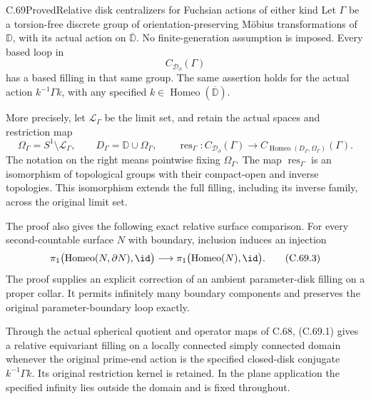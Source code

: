 \begin{claim}{C.69}{Proved}{Relative disk centralizers for Fuchsian actions of either kind}
Let $\Gamma$ be a torsion-free discrete group of
orientation-preserving M\"obius transformations of
$\mathbb D$, with its actual action on
$\overline{\mathbb D}$. No finite-generation
assumption is imposed. Every based loop in
\[
                 C_{\mathcal D_\partial}(\Gamma)
                                                               \tag{C.69.1}
\]
has a based filling in that same group.
The same assertion holds for the actual action
$k^{-1}\Gamma k$, with any specified
$k\in\operatorname{Homeo}(\overline{\mathbb D})$.

More precisely, let $\mathcal L_\Gamma$ be the
limit set, and retain the actual spaces and
restriction map
\[
 \Omega_\Gamma=S^1\setminus\mathcal L_\Gamma,\qquad
 D_\Gamma=\mathbb D\cup\Omega_\Gamma,\qquad
 \operatorname{res}_\Gamma:
 C_{\mathcal D_\partial}(\Gamma)\longrightarrow
 C_{\operatorname{Homeo}(D_\Gamma,\Omega_\Gamma)}(\Gamma).
                                                               \tag{C.69.2}
\]
The notation on the right means pointwise fixing
$\Omega_\Gamma$. The map
$\operatorname{res}_\Gamma$ is an isomorphism
of topological groups with their compact-open
and inverse topologies. This isomorphism
extends the full filling, including its inverse
family, across the original limit set.

The proof also gives the following exact relative
surface comparison. For every second-countable
surface $N$ with boundary, inclusion induces
an injection
\[
 \pi_1\bigl(\operatorname{Homeo}(N,\partial N),\id\bigr)
       \longrightarrow
 \pi_1\bigl(\operatorname{Homeo}(N),\id\bigr).
                                                               \tag{C.69.3}
\]
The proof supplies an explicit correction of an
ambient parameter-disk filling on a proper collar.
It permits infinitely many boundary components
and preserves the original parameter-boundary
loop exactly.

Through the actual spherical quotient and
operator maps of C.68, (C.69.1) gives a relative
equivariant filling on a locally connected
simply connected domain whenever the original
prime-end action is the specified closed-disk
conjugate $k^{-1}\Gamma k$. Its original
restriction kernel is retained. In the plane
application the specified infinity lies outside
the domain and is fixed throughout.
\end{claim}

